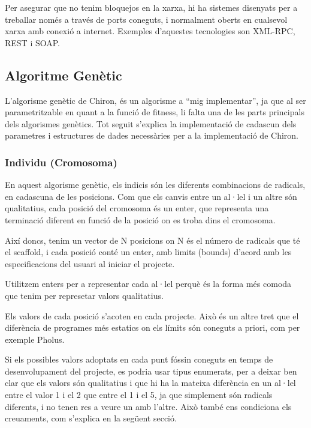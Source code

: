 \documentclass[titlepage,a4paper,12pt]{book}
\begin{document}
Per asegurar que no tenim bloquejos en la xarxa, hi ha sistemes disenyats per a
treballar només a través de ports coneguts, i normalment oberts en cualsevol
xarxa amb conexió a internet.  Exemples d'aquestes tecnologies son XML-RPC, REST
i SOAP.


\subsection{Algoritme Genètic} %
	\label{sub:Algoritme Genetic}

L'algorisme genètic de Chiron, és un algorisme a ``mig implementar'', ja que al
ser parametritzable en quant a la funció de fitness, li falta una de les parts
principals dels algorismes genètics.  Tot seguit s'explica la implementació de
cadascun dels parametres i estructures de dades necessàries per a la
implementació de Chiron.

\subsubsection{Individu (Cromosoma)}
\label{ssub:individu (cromosoma)}

En aquest algorisme genètic, els indicis són les diferents combinacions de
radicals, en cadascuna de les posicions. Com que els canvis entre un al·lel i un
altre són qualitatius, cada posició del cromosoma és un enter, que representa
una terminació diferent en funció de la posició on es troba dins el cromosoma.

Així doncs, tenim un vector de N posicions on N és el número de radicals que té
el scaffold, i cada posició conté un enter, amb limits (bounds) d'acord amb les
especificacions del usuari al iniciar el projecte. 

Utilitzem enters per a representar cada al·lel perquè és la forma més comoda que
tenim per represetar valors qualitatius.

Els valors de cada posició s'acoten en cada projecte.  Això és un
altre tret que el diferència de programes més estatics on els límits són
coneguts a priori, com per exemple Pholus.

Si els possibles valors adoptats en cada punt fóssin coneguts en temps de
desenvolupament del projecte, es podria usar tipus enumerats, per a deixar ben
clar que els valors són qualitatius i que hi ha la mateixa diferència en un
al·lel entre el valor 1 i el 2 que entre el 1 i el 5, ja que simplement són
radicals diferents, i no tenen res a veure un amb l'altre.  Això també ens
condiciona els creuaments, com s'explica en la següent secció.
\end{document}
